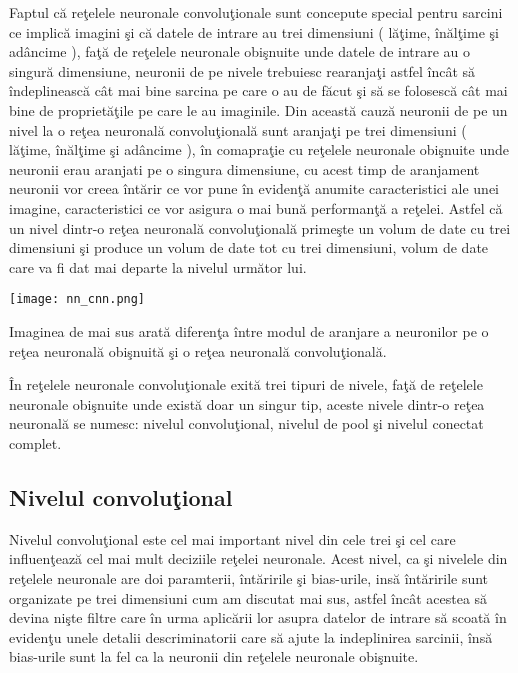 \par

Faptul c\u{a} re\c{t}elele neuronale convolu\c{t}ionale sunt concepute special pentru sarcini ce implic\u{a} imagini \c{s}i c\u{a} datele de intrare  au trei dimensiuni ( l\u{a}\c{t}ime, \^{i}n\u{a}l\c{t}ime \c{s}i ad\^{a}ncime ),  fa\c{t}\u{a} de re\c{t}elele neuronale obi\c{s}nuite unde datele de intrare au o singur\u{a} dimensiune, neuronii de pe nivele trebuiesc rearanja\c{t}i astfel \^{i}nc\^{a}t s\u{a} \^{i}ndeplineasc\u{a} c\^{a}t mai bine sarcina pe care o au de f\u{a}cut \c{s}i s\u{a} se folosesc\u{a} c\^{a}t mai bine de propriet\u{a}\c{t}ile pe care le au imaginile. Din aceast\u{a} cauz\u{a} neuronii de pe un nivel la o re\c{t}ea neuronal\u{a} convolu\c{t}ional\u{a} sunt aranja\c{t}i pe trei dimensiuni ( l\u{a}\c{t}ime, \^{i}n\u{a}l\c{t}ime \c{s}i ad\^{a}ncime ), \^{i}n comapra\c{t}ie cu re\c{t}elele neuronale obi\c{s}nuite unde neuronii erau aranjati pe o singura dimensiune, cu acest timp de aranjament neuronii vor creea \^{i}nt\u{a}rir ce vor pune \^{i}n eviden\c{t}\u{a} anumite caracteristici ale unei imagine, caracteristici ce vor asigura o mai bun\u{a} performan\c{t}\u{a} a re\c{t}elei. Astfel c\u{a} un nivel dintr-o re\c{t}ea neuronal\u{a} convolu\c{t}ional\u{a} prime\c{s}te un volum de date cu trei dimensiuni \c{s}i produce un volum de date tot cu trei dimensiuni, volum de date care va fi dat mai departe la nivelul urm\u{a}tor lui.

\par 

\begin{center}
\texttt{[image: nn\_cnn.png]}
\end{center}

Imaginea de mai sus arat\u{a} diferen\c{t}a \^{i}ntre modul de aranjare a neuronilor pe o re\c{t}ea neuronal\u{a} obi\c{s}nuit\u{a} \c{s}i o re\c{t}ea neuronal\u{a} convolu\c{t}ional\u{a}.

\^{I}n re\c{t}elele neuronale convolu\c{t}ionale exit\u{a} trei tipuri de nivele, fa\c{t}\u{a} de re\c{t}elele neuronale obi\c{s}nuite unde exist\u{a} doar un singur tip, aceste nivele dintr-o re\c{t}ea neuronal\u{a} se numesc: nivelul convolu\c{t}ional, nivelul de pool \c{s}i nivelul conectat complet.

\subsection{Nivelul convolu\c{t}ional}

Nivelul convolu\c{t}ional este cel mai important nivel din cele trei \c{s}i cel care influen\c{t}eaz\u{a} cel mai mult deciziile re\c{t}elei neuronale. Acest nivel, ca \c{s}i nivelele din re\c{t}elele neuronale are doi paramterii, \^{i}nt\u{a}ririle \c{s}i bias-urile, ins\u{a} \^{i}nt\u{a}ririle sunt organizate pe trei dimensiuni cum am discutat mai sus, astfel \^{i}nc\^{a}t acestea s\u{a} devina ni\c{s}te filtre care \^{i}n urma aplic\u{a}rii lor asupra datelor de intrare s\u{a} scoat\u{a} \^{i}n eviden\c{t}u unele detalii descriminatorii care s\u{a} ajute la indeplinirea sarcinii, \^{i}ns\u{a} bias-urile sunt la fel ca la neuronii din re\c{t}elele neuronale obi\c{s}nuite. 

